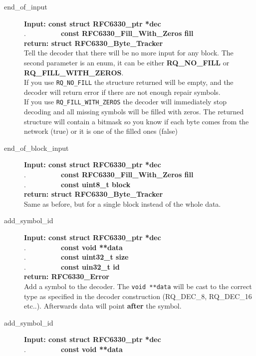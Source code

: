 \documentclass[11pt,a4paper]{refart}
\begin{document}
\begin{description}
\item[end\_of\_input]\textbf{Input: const struct RFC6330\_ptr *dec}\\
.\ \ \ \ \ \ \ \ \ \ 
\textbf{const RFC6330\_Fill\_With\_Zeros fill}\\
\textbf{return: struct RFC6330\_Byte\_Tracker}\\
Tell the decoder that there will be no more input for any block.
The second parameter is an enum, it can be either \textbf{RQ\_NO\_FILL} or \textbf{RQ\_FILL\_WITH\_ZEROS}.\\
If you use \texttt{RQ\_NO\_FILL} the structure returned will be empty, and the decoder will return error if there are not enough repair symbols.\\
If you use \texttt{RQ\_FILL\_WITH\_ZEROS} the decoder will immediately stop decoding and all missing symbols will be filled with zeros. The returned structure will contain a bitmask so you know if each byte comes from the network (true) or it is one of the filled ones (false)
\item[end\_of\_block\_input]\textbf{Input: const struct RFC6330\_ptr *dec}\\
.\ \ \ \ \ \ \ \ \ \ 
\textbf{const RFC6330\_Fill\_With\_Zeros fill}\\
.\ \ \ \ \ \ \ \ \ \ \textbf{const uint8\_t block}\\
\textbf{return: struct RFC6330\_Byte\_Tracker}\\
Same as before, but for a single block instead of the whole data.
\item[add\_symbol\_id]\textbf{Input: const struct RFC6330\_ptr *dec}\\
.\ \ \ \ \ \ \ \ \ \ \textbf{const void **data}\\
.\ \ \ \ \ \ \ \ \ \ \textbf{const uint32\_t size}\\
.\ \ \ \ \ \ \ \ \ \ \textbf{const uin32\_t id}\\
\textbf{return: RFC6330\_Error}\\
Add a symbol to the decoder. The \texttt{void **data} will be cast to the correct type as specified in the decoder construction (RQ\_DEC\_8, RQ\_DEC\_16 etc..). Afterwards data will point \textbf{after} the symbol.
\item[add\_symbol\_id]\textbf{Input: const struct RFC6330\_ptr *dec}\\
.\ \ \ \ \ \ \ \ \ \ \textbf{const void **data}\\

\end{description}
\end{document}
